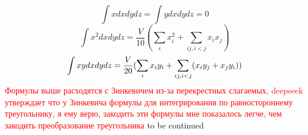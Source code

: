 \documentclass[a4paper,12pt]{article}
\begin{document}
\begin{equation}
    \int xdxdydz = \int ydxdydz = 0 
\end{equation}
\begin{equation}
    \int x^2 dxdydz =  \frac{V}{10} (\sum_i x^2_i + \sum_{ij, i<j} x_i x_j) 
\end{equation}
\begin{equation}
    \int xy \space dxdydz =  \frac{V}{20} (\sum_i x_i y_i + \sum_{ij, i<j}( x_i y_j + x_j y_i)) 
\end{equation}
\textcolor{red}{Формулы выше расходятся с Зинкевичем из-за перекрестных слагаемых, deepseek утверждает что у Зинкевича формулы для интегрирования по равностороннему треугольнику, я ему верю, закодить эти формулы мне показалось легче, чем закодить преобразование треугольника}
to be continued


\begin{lstlisting}

\end{lstlisting}
\end{document}
